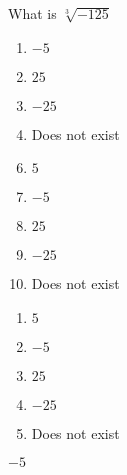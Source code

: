 





 What is $\sqrt[3]{-125}$


\ifsat
	\begin{enumerate}[label=\Alph*)]
		\item  $-5$%
		\item  $25$
		\item  $-25$
		\item   Does not exist
	\end{enumerate}
\else
\fi

\ifacteven
	\begin{enumerate}[label=\textbf{\Alph*.},itemsep=\fill,align=left]
		\setcounter{enumii}{5}
		\item   $5$
		\item  $-5$%
		\item  $25$
		\addtocounter{enumii}{1}
		\item  $-25$
		\item   Does not exist
	\end{enumerate}
\else
\fi

\ifactodd
	\begin{enumerate}[label=\textbf{\Alph*.},itemsep=\fill,align=left]
		\item   $5$
		\item  $-5$%
		\item  $25$
		\item  $-25$
		\item   Does not exist
	\end{enumerate}
\else
\fi

\ifgridin
  $-5$%
		
\else
\fi

